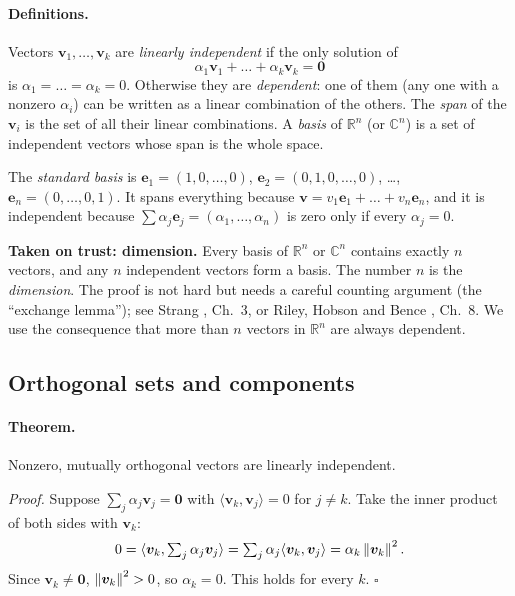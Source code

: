 \paragraph{Definitions.} Vectors $\bm v_1,\dots,\bm v_k$ are \emph{linearly independent} if the only solution of
\[
\alpha_1\bm v_1+\dots+\alpha_k\bm v_k=\bm 0
\]
is $\alpha_1=\dots=\alpha_k=0$. Otherwise they are \emph{dependent}: one of them (any one with a nonzero $\alpha_i$) can be written as a linear combination of the others. The \emph{span} of the $\bm v_i$ is the set of all their linear combinations. A \emph{basis} of $\mathbb R^n$ (or $\mathbb C^n$) is a set of independent vectors whose span is the whole space.

The \emph{standard basis} is $\bm e_1=(1,0,\dots,0)$, $\bm e_2=(0,1,0,\dots,0)$, \dots, $\bm e_n=(0,\dots,0,1)$. It spans everything because $\bm v=v_1\bm e_1+\dots+v_n\bm e_n$, and it is independent because $\sum\alpha_j\bm e_j=(\alpha_1,\dots,\alpha_n)$ is zero only if every $\alpha_j=0$.

\begin{beyond}
\textbf{Taken on trust: dimension.} Every basis of $\mathbb R^n$ or $\mathbb C^n$ contains exactly $n$ vectors, and any $n$ independent vectors form a basis. The number $n$ is the \emph{dimension}. The proof is not hard but needs a careful counting argument (the ``exchange lemma''); see Strang \cite{strang}, Ch.~3, or Riley, Hobson and Bence \cite{rhb}, Ch.~8. We use the consequence that more than $n$ vectors in $\mathbb R^n$ are always dependent.
\end{beyond}

\subsection{Orthogonal sets and components}

\paragraph{Theorem.} Nonzero, mutually orthogonal vectors are linearly independent.

\emph{Proof.} Suppose $\sum_j\alpha_j\bm v_j=\bm 0$ with $\langle\bm v_k,\bm v_j\rangle=0$ for $j\neq k$. Take the inner product of both sides with $\bm v_k$:
\[
0=\langle\bm v_k,\textstyle\sum_j\alpha_j\bm v_j\rangle=\sum_j\alpha_j\langle\bm v_k,\bm v_j\rangle=\alpha_k\left\lVert \bm v_k\right\rVert^2 .
\]
Since $\bm v_k\ne\bm 0$, $\left\lVert \bm v_k\right\rVert^2>0$, so $\alpha_k=0$. This holds for every $k$. $\square$

